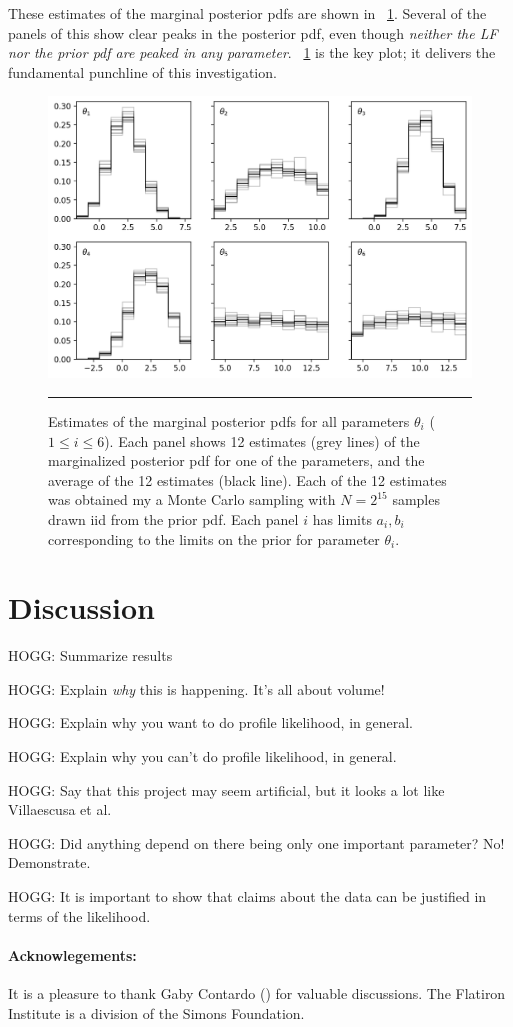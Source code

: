 \documentclass[10pt]{article}
\newcommand{\figref}[1]{\figurename~\ref{#1}}
\begin{document}
These estimates of the marginal posterior pdfs are shown in \figref{fig:Experiment1}.
Several of the panels of this \figurename{} show clear peaks in the posterior pdf, even though \emph{neither the LF nor the prior pdf are peaked in any parameter}.
\figref{fig:Experiment1} is the key plot; it delivers the fundamental punchline of this investigation.
\begin{figure}[t!]
\includegraphics[width=\textwidth]{./notebooks/Experiment1.png}
\caption{Estimates of the marginal posterior pdfs for all parameters $\theta_i$ ($1\leq i\leq 6$). Each panel shows 12 estimates (grey lines) of the marginalized posterior pdf for one of the parameters, and the average of the 12 estimates (black line). Each of the 12 estimates was obtained my a Monte Carlo sampling with $N=2^{15}$ samples drawn iid from the prior pdf. Each panel $i$ has limits $a_i, b_i$ corresponding to the limits on the prior for parameter $\theta_i$.\label{fig:Experiment1}}
\rule{\textwidth}{0.1pt}
\end{figure}

\section{Discussion}

HOGG: Summarize results

HOGG: Explain \emph{why} this is happening. It's all about volume!

HOGG: Explain why you want to do profile likelihood, in general.

HOGG: Explain why you can't do profile likelihood, in general.

HOGG: Say that this project may seem artificial, but it looks a lot like Villaescusa et al.

HOGG: Did anything depend on there being only one important parameter? No! Demonstrate.

HOGG: It is important to show that claims about the data can be justified in terms of the likelihood.

\paragraph{Acknowlegements:}
It is a pleasure to thank
  Gaby Contardo ()
for valuable discussions.
The Flatiron Institute is a division of the Simons Foundation.

\end{document}
